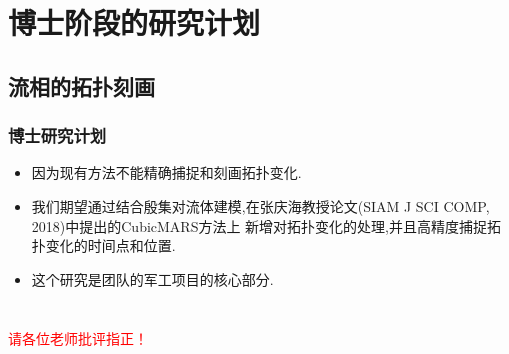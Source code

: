 \documentclass[UTF8]{ctexbeamer}	%
\theoremstyle{plain}
\theoremstyle{definition}
\theoremstyle{remark}
\numberwithin{equation}{section}
\begin{document}
\section{博士阶段的研究计划}
\subsection{流相的拓扑刻画}
\begin{frame}
    \frametitle{博士研究计划}
        \begin{itemize}
        \item 因为现有方法不能精确捕捉和刻画拓扑变化.
        \item 我们期望通过结合殷集对流体建模,在张庆海教授论文(SIAM J SCI COMP, 2018)中提出的CubicMARS方法上
        新增对拓扑变化的处理,并且高精度捕捉拓扑变化的时间点和位置.
        \item 这个研究是团队的军工项目的核心部分.
    \end{itemize}
\end{frame}



\section*{}
\begin{frame}
    \centering\huge
    \textcolor{red}{请各位老师批评指正！}
\end{frame}
\end{document}
